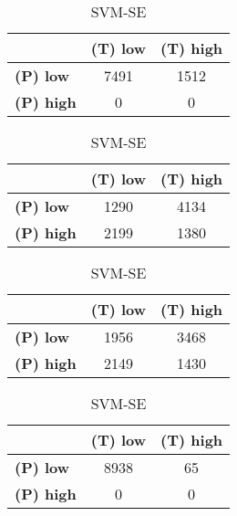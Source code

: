 \begin{landscape}
\begin{table}[htbp]
\centering
\caption{PCA_ELR__05 RP3}
\begin{minipage}{.3\textwidth}
\tiny
\caption*{SVM-AP}
\begin{tabular}{|l|c|c|}
\hline
					& \textbf{(T) low}	& \textbf{(T) high}	\\ \hline
\textbf{(P) low}	& 7491				& 1512				\\ \hline
\textbf{(P) high}	& 0					& 0					\\ \hline
\end{tabular}
\end{minipage}\hfill
\begin{minipage}{.3\textwidth}
\tiny
\caption*{SVM-AT}
\begin{tabular}{|l|c|c|}
\hline
					& \textbf{(T) low}	& \textbf{(T) high}	\\ \hline
\textbf{(P) low}	& 1290				& 4134				\\ \hline
\textbf{(P) high}	& 2199				& 1380				\\ \hline
\end{tabular}
\end{minipage}\hfill
\begin{minipage}{.3\textwidth}
\tiny
\caption*{SVM-PL}
\begin{tabular}{|l|c|c|}
\hline
					& \textbf{(T) low}	& \textbf{(T) high}	\\ \hline
\textbf{(P) low}	& 1956				& 3468				\\ \hline
\textbf{(P) high}	& 2149				& 1430				\\ \hline
\end{tabular}
\end{minipage}\hfill
\begin{minipage}{.3\textwidth}
\tiny
\caption*{SVM-SE}
\begin{tabular}{|l|c|c|}
\hline
					& \textbf{(T) low}	& \textbf{(T) high}	\\ \hline
\textbf{(P) low}	& 8938				& 65				\\ \hline
\textbf{(P) high}	& 0					& 0					\\ \hline
\end{tabular}
\end{minipage}\hfill
\end{table}
\begin{table}[htbp]
\centering
\begin{minipage}{.3\textwidth}
\tiny
\caption*{MLP-AP}

\end{minipage}
\end{table}
\end{landscape}
